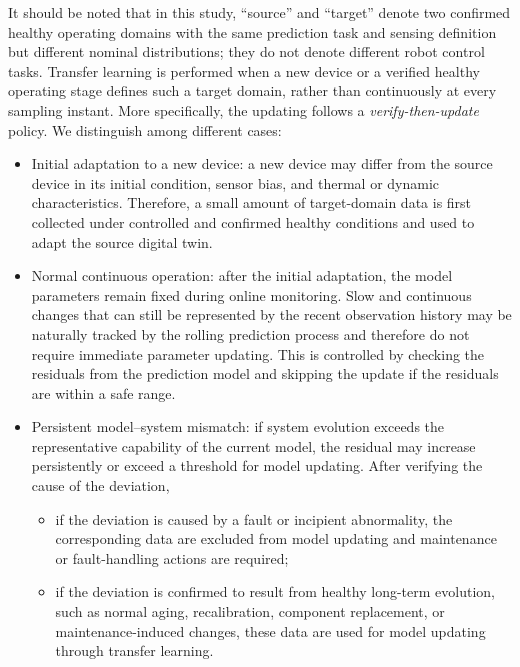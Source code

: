 \documentclass[a4paper,10pt]{cas-sc}%
\newcommand{\rev}[1]{\textcolor{revisionred}{#1}}
\begin{document}
\rev{It should be noted that in this study,  ``source'' and ``target'' denote two confirmed healthy operating domains with the same prediction task and sensing definition but different nominal distributions; they do not denote different robot control tasks. Transfer learning is performed when a new device or a verified healthy operating stage defines such a target domain, rather than continuously at every sampling instant. More specifically, the updating follows a \emph{verify-then-update} policy. We distinguish among different cases:}
\begin{itemize}
	\item \rev{Initial adaptation to a new device: a new device may differ from the source device in its initial condition, sensor bias, and thermal or dynamic characteristics. Therefore, a small amount of target-domain data is first collected under controlled and confirmed healthy conditions and used to adapt the source digital twin.}
	\item \rev{Normal continuous operation: after the initial adaptation, the model parameters remain fixed during online monitoring. Slow and continuous changes that can still be represented by the recent observation history may be naturally tracked by the rolling prediction process and therefore do not require immediate parameter updating. This is controlled by checking the residuals from the prediction model and skipping the update if the residuals are within a safe range.}
	\item \rev{Persistent model--system mismatch: if system evolution exceeds the representative capability of the current model, the residual may increase persistently or exceed a threshold for model updating. After verifying the cause of the deviation,}
	\begin{itemize}
		\item \rev{if the deviation is caused by a fault or incipient abnormality, the corresponding data are excluded from model updating and maintenance or fault-handling actions are required;}
		\item \rev{if the deviation is confirmed to result from healthy long-term evolution, such as normal aging, recalibration, component replacement, or maintenance-induced changes, these data are used for model updating through transfer learning.}
	\end{itemize}
\end{itemize} 
\end{document}
